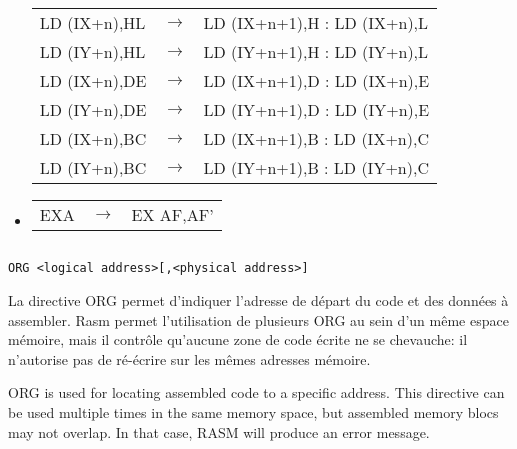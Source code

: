 \begin{itemize}
\begin{tabular}{lll}
LD (IX+n),HL & $\rightarrow$ & LD (IX+n+1),H : LD (IX+n),L \\
LD (IY+n),HL & $\rightarrow$ & LD (IY+n+1),H : LD (IY+n),L \\
LD (IX+n),DE & $\rightarrow$ & LD (IX+n+1),D : LD (IX+n),E \\
LD (IY+n),DE & $\rightarrow$ & LD (IY+n+1),D : LD (IY+n),E \\
LD (IX+n),BC & $\rightarrow$ & LD (IX+n+1),B : LD (IX+n),C \\
LD (IY+n),BC & $\rightarrow$ & LD (IY+n+1),B : LD (IY+n),C \\
\end{tabular}

\item {}

\begin{tabular}{lll}
EXA & $\rightarrow$ & EX AF,AF' \\
\end{tabular}

\end{itemize}



\subsection{}

\subsubsection{}

\begin{verbatim}
ORG <logical address>[,<physical address>]
\end{verbatim}

\begin{xfr}
La directive ORG permet d'indiquer l'adresse de départ du code et des données à assembler.
  Rasm permet l'utilisation de plusieurs ORG au sein d'un même espace mémoire, mais il contrôle qu'aucune zone de code écrite ne se chevauche: il n'autorise pas de ré-écrire sur les mêmes adresses mémoire.
\end{xfr}

\begin{xen}
ORG is used for locating assembled code to a specific address.
This directive can be used multiple times in the same memory space, but assembled memory blocs may not overlap.
In that case, RASM will produce an error message.
\end{xen}

